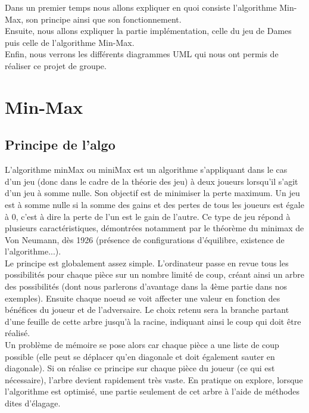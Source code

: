 \documentclass[12,french]{report}
\begin{document}
Dans un premier temps nous allons expliquer en quoi consiste l'algorithme Min-Max, son principe ainsi que son fonctionnement.\\

Ensuite, nous allons expliquer la partie implémentation, celle du jeu de Dames puis celle de l'algorithme Min-Max.\\

Enfin, nous verrons les différents diagrammes UML qui nous ont permis de réaliser ce projet de groupe.\\

\chapter{Min-Max}

\section{Principe de l'algo}

L'algorithme minMax ou miniMax est un algorithme s'appliquant dans
le cas d'un jeu (donc dans le cadre de la théorie des jeu) à deux
joueurs lorsqu'il s'agit d'un jeu à somme nulle. Son objectif est
de minimiser la perte maximum. Un jeu est à somme nulle si la somme
des gains et des pertes de tous les joueurs est égale à 0, c'est à
dire la perte de l'un est le gain de l'autre. Ce type de jeu répond
à plusieurs caractéristiques, démontrées notamment par le théorème
du minimax de Von Neumann, dès 1926 (présence de configurations d'équilibre,
existence de l'algorithme...).\\

Le principe est globalement assez simple. L'ordinateur passe en revue
tous les possibilités pour chaque pièce sur un nombre limité de coup,
créant ainsi un arbre des possibilités (dont nous parlerons d'avantage
dans la 4ème partie dans nos exemples). Ensuite chaque noeud se voit
affecter une valeur en fonction des bénéfices du joueur et de l'adversaire.
Le choix retenu sera la branche partant d'une feuille de cette arbre
jusqu'à la racine, indiquant ainsi le coup qui doit être réalisé. \\

Un problème de mémoire se pose alors car chaque pièce a une liste de coup possible (elle peut se déplacer qu'en diagonale et doit également sauter en diagonale). Si on réalise ce principe sur chaque pièce du joueur (ce qui est nécessaire), l'arbre devient rapidement très vaste. En pratique on explore, lorsque l'algorithme est optimisé,
une partie seulement de cet arbre à l'aide de méthodes dites d'élagage.
\end{document}
